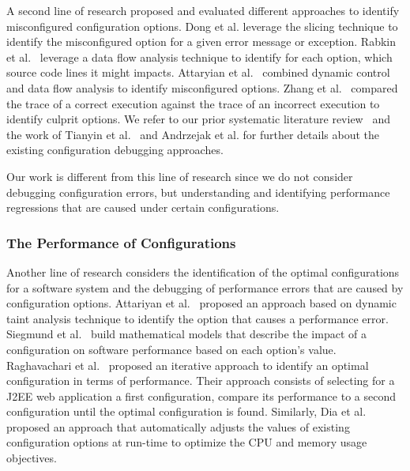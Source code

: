 A second line of research proposed and evaluated different approaches to identify misconfigured configuration options. Dong et al.\cite{RN2805, RN3163} leverage the slicing technique to identify the misconfigured option for a given error message or exception. Rabkin et al.~\cite{RN2822} leverage a data flow analysis technique to identify for each option, which source code lines it might impacts. Attaryian et al.~\cite{RN3248} combined dynamic control and data flow analysis to identify misconfigured options. Zhang et al.~\cite{RN2839, RN2777} compared the trace of a correct execution against the trace of an incorrect execution to identify culprit options. We refer to our prior systematic literature review~\cite{tse} and the work of Tianyin et al.~\cite{RN3252} and Andrzejak et al.\cite{andrzejaksoftware} for further details about the existing configuration debugging approaches. 

Our work is different from this line of research since we do not consider debugging configuration errors, but understanding and identifying performance regressions that are caused under certain configurations.

\subsubsection{The Performance of Configurations} 

Another line of research considers the identification of the optimal configurations for a software system and the debugging of performance errors that are caused by configuration options. Attariyan et al.~\cite{RN3253} proposed an approach based on dynamic taint analysis technique to identify the option that causes a performance error. %
Siegmund et al.~\cite{RN2880} build mathematical models that describe the impact of a configuration on software performance based on each option's value. Raghavachari et al.~\cite{RN3537} proposed an iterative approach to identify an optimal configuration in terms of performance. Their approach consists of selecting for a J2EE web application a first configuration, compare its performance to a second configuration until the optimal configuration is found. Similarly, Dia et al.~\cite{RN3543} proposed an approach that automatically adjusts the values of existing configuration options at run-time to optimize the CPU and memory usage objectives.

